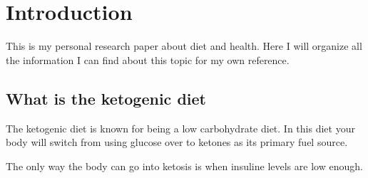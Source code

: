 \section{Introduction}

This is my personal research paper about diet and health. Here I will organize all the information I can find about this topic for my own reference. 

\subsection{What is the ketogenic diet}

The ketogenic diet is known for being a low carbohydrate diet. In this diet your body will switch from using glucose over to ketones as its primary fuel source. 

The only way the body can go into ketosis is when insuline levels are low enough. 